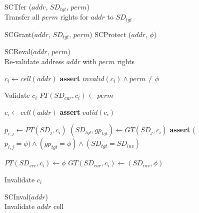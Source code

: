 \begin{figure}
\begin{multicols}{2}
    \begin{algorithm}[H]
      \caption{SCTfer ($addr$, $SD_{tgt}$, $perm$) \\
      Transfer all $perm$ rights for $addr$ to $SD_{tgt}$    }
      \begin{algorithmic}[1]
        \State SCGrant($addr$, $SD_{tgt}$, $perm$)
        \State SCProtect ($addr$, $\phi$)
      \end{algorithmic}
      \label{alg:seccells:tfer}
    \end{algorithm}
    \vspace{-1.5\baselineskip}

    \begin{algorithm}[H]
      \caption{SCReval($addr$, $perm$)  \\
      Re-validate address $addr$ with $perm$ rights}
      \begin{algorithmic}[1]

        \State $c_i \gets cell(addr)$
        \State \textbf{assert} $invalid(c_i) \land perm \ne \phi$

        \State Validate $c_i$
        \State $PT(SD_{cur}, c_i) \gets perm$

      \end{algorithmic}
      \label{alg:seccells:screval}
    \end{algorithm}
    \vspace{-1.5\baselineskip}

    \begin{algorithm}[H]
      \caption{SCInval($addr$)  \\
      Invalidate $addr$ cell}
      \begin{algorithmic}[1]

        \State $c_i \gets cell(addr)$
        \State \textbf{assert} $valid(c_i)$

          \State $p_{i, j} \gets PT(SD_j, c_i)$
          \State $(SD_{tgt}, gp_{tgt}) \gets GT(SD_j, c_i)$
          \State \textbf{assert} ($p_{i,j} = \phi) \land (gp_{tgt} = \phi) \land (SD_{tgt} = SD_{inv})$
        \EndFor

        \State $PT(SD_{src}, c_i) \gets \phi$
        \State $GT(SD_{cur}, c_i) \gets (SD_{inv}, \phi)$

        \State Invalidate $c_i$
      \end{algorithmic}
      \label{alg:seccells:scinval}
    \end{algorithm}
    \vspace{-1.5\baselineskip}


\end{multicols}
\end{figure}
